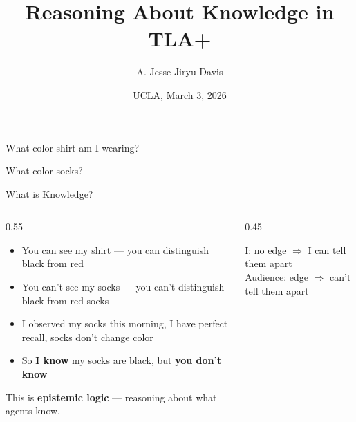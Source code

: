 \documentclass[aspectratio=169,12pt]{beamer}
\title{Reasoning About Knowledge in TLA+}
\author{A. Jesse Jiryu Davis}
\date{UCLA, March 3, 2026}
\begin{document}

\begin{frame}
\titlepage
\end{frame}


\begin{frame}{What color shirt am I wearing?}
\pause
\begin{center}
\Large What color socks?
\end{center}
\end{frame}

\begin{frame}{What is Knowledge?}
\begin{columns}[T]
\begin{column}{0.55\textwidth}
\begin{itemize}
\item You can see my shirt --- you can distinguish black from red
\item You can't see my socks --- you can't distinguish black from red socks
\item I observed my socks this morning, I have perfect recall, socks don't change color
\item So \textbf{I know} my socks are black, but \textbf{you don't know}
\end{itemize}

\vspace{0.8em}
This is \textbf{epistemic logic} --- reasoning about what agents know.
\end{column}
\begin{column}{0.45\textwidth}
\begin{center}
\end{center}
\vspace{0.5em}
{\footnotesize
\textcolor{agent0}{I}: no edge $\Rightarrow$ I can tell them apart\\
\textcolor{agent1}{Audience}: edge $\Rightarrow$ can't tell them apart
}
\end{column}
\end{columns}
\end{frame}
\end{document}
